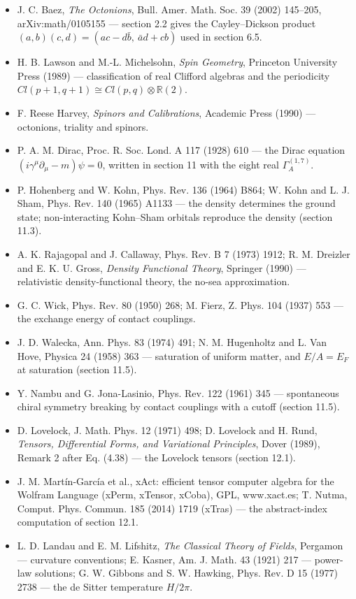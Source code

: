 \documentclass[10pt,a4paper]{article}
\begin{document}
\begin{itemize}
\item J. C. Baez, \emph{The Octonions}, Bull. Amer. Math. Soc. 39 (2002) 145–205, arXiv:math/0105155 — section 2.2 gives the Cayley–Dickson product $(a,b)(c,d)=(ac-d\bar b,\ \bar a d+cb)$ used in section 6.5.
\item H. B. Lawson and M.-L. Michelsohn, \emph{Spin Geometry}, Princeton University Press (1989) — classification of real Clifford algebras and the periodicity $Cl(p+1,q+1)\cong Cl(p,q)\otimes\mathbb R(2)$.
\item F. Reese Harvey, \emph{Spinors and Calibrations}, Academic Press (1990) — octonions, triality and spinors.
\item P. A. M. Dirac, Proc. R. Soc. Lond. A 117 (1928) 610 — the Dirac equation $(i\gamma^\mu\partial_\mu-m)\psi=0$, written in section 11 with the eight real $\Gamma^{(1,7)}_A$.
\item P. Hohenberg and W. Kohn, Phys. Rev. 136 (1964) B864; W. Kohn and L. J. Sham, Phys. Rev. 140 (1965) A1133 — the density determines the ground state; non-interacting Kohn–Sham orbitals reproduce the density (section 11.3).
\item A. K. Rajagopal and J. Callaway, Phys. Rev. B 7 (1973) 1912; R. M. Dreizler and E. K. U. Gross, \emph{Density Functional Theory}, Springer (1990) — relativistic density-functional theory, the no-sea approximation.
\item G. C. Wick, Phys. Rev. 80 (1950) 268; M. Fierz, Z. Phys. 104 (1937) 553 — the exchange energy of contact couplings.
\item J. D. Walecka, Ann. Phys. 83 (1974) 491; N. M. Hugenholtz and L. Van Hove, Physica 24 (1958) 363 — saturation of uniform matter, and $E/A=E_F$ at saturation (section 11.5).
\item Y. Nambu and G. Jona-Lasinio, Phys. Rev. 122 (1961) 345 — spontaneous chiral symmetry breaking by contact couplings with a cutoff (section 11.5).
\item D. Lovelock, J. Math. Phys. 12 (1971) 498; D. Lovelock and H. Rund, \emph{Tensors, Differential Forms, and Variational Principles}, Dover (1989), Remark 2 after Eq. (4.38) — the Lovelock tensors (section 12.1).
\item J. M. Martín-García et al., xAct: efficient tensor computer algebra for the Wolfram Language (xPerm, xTensor, xCoba), GPL, www.xact.es; T. Nutma, Comput. Phys. Commun. 185 (2014) 1719 (xTras) — the abstract-index computation of section 12.1.
\item L. D. Landau and E. M. Lifshitz, \emph{The Classical Theory of Fields}, Pergamon — curvature conventions; E. Kasner, Am. J. Math. 43 (1921) 217 — power-law solutions; G. W. Gibbons and S. W. Hawking, Phys. Rev. D 15 (1977) 2738 — the de Sitter temperature $H/2\pi$.

\end{itemize}
\end{document}
